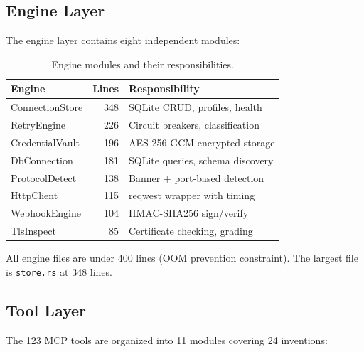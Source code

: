 \documentclass[10pt,twocolumn]{article}
\begin{document}
\subsection{Engine Layer}

The engine layer contains eight independent modules:

\begin{table}[h]
\centering
\caption{Engine modules and their responsibilities.}
\label{tab:engines}
\begin{tabular}{@{}lrl@{}}
\toprule
\textbf{Engine} & \textbf{Lines} & \textbf{Responsibility} \\
\midrule
ConnectionStore & 348 & SQLite CRUD, profiles, health \\
RetryEngine & 226 & Circuit breakers, classification \\
CredentialVault & 196 & AES-256-GCM encrypted storage \\
DbConnection & 181 & SQLite queries, schema discovery \\
ProtocolDetect & 138 & Banner + port-based detection \\
HttpClient & 115 & reqwest wrapper with timing \\
WebhookEngine & 104 & HMAC-SHA256 sign/verify \\
TlsInspect & 85 & Certificate checking, grading \\
\bottomrule
\end{tabular}
\end{table}

All engine files are under 400 lines (OOM prevention constraint). The largest file is \texttt{store.rs} at 348 lines.

\subsection{Tool Layer}

The 123 MCP tools are organized into 11 modules covering 24 inventions:
\end{document}

